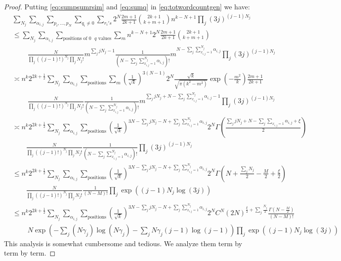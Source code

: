 \documentclass[12pt]{article}
\numberwithin{equation}{section}
\numberwithin{equation}{section}
\theoremstyle{definition}
\renewcommand{\1}{\bf 1}
\begin{document}
\begin{proof}
\noindent
Putting \eqref{eq:sumpsumrsim} and \eqref{eq:sumq} in \eqref{eq:totwordcountgen} we have:
\begin{equation}\label{eq:totwordgensim}
\begin{split}
& \sum_{N_{j}}\sum_{\alpha_{i,j}}\sum_{p_{i},\ldots,p_{N}}\sum_{q_{i} \neq 0}\sum_{r_{i}'s} 2^{N}\frac{2m+1}{2k+1}\binom{2k+1}{k+m+1} n^{k-N+1}\prod_{j}(3j)^{(j-1)N_{j}}\\
& \le \sum_{N_{j}} \sum_{\alpha_{i,j}}\sum_{\text{positions of $0$ $q$ values}} \sum_{m}n^{k-N+1}2^{N}\frac{2m+1}{2k+1} \binom{2k+1}{k+m+1} \\
&~~~~~~~~~~\frac{N}{\prod_{j} ((j-1)!)^{N_{j}} \prod_{j} N_{j}!} m^{\sum_{j} jN_{j}-1} \frac{1}{\left(N- \sum_{j}\sum_{x_{i,j}=1}^{N_{j}}\alpha_{i,j}\right)!} m^{N- \sum_{j}\sum_{x_{i,j}=1}^{N_{j}}\alpha_{i,j}} \prod_{j}(3j)^{(j-1)N_{j}}\\
& \asymp n^{k}2^{2k+\frac{1}{2}}\sum_{N_{j}} \sum_{\alpha_{i,j}}\sum_{\text{positions}} \sum_{m}\left( \frac{1}{\sqrt{k}}\right)^{3(N-1)} 2^{N} \frac{\sqrt{k}}{\sqrt{\pi(k^2-m^{2})}}\exp\left( -\frac{m^2}{k} \right)\frac{2m+1}{2k+1}\\
&~~~~~~~~~~ \frac{N}{\prod_{j} ((j-1)!)^{N_{j}} \prod_{j} N_{j}!}\frac{1}{\left(N- \sum_{j}\sum_{x_{i,j}=1}^{N_{j}}\alpha_{i,j}\right)!} m^{\sum_{j}jN_{j}+ N- \sum_{j}\sum_{x_{i,j}=1}^{N_{j}}\alpha_{i,j}-1} \prod_{j}(3j)^{(j-1)N_{j}}\\
& \asymp n^{k}2^{2k+\frac{1}{2}} \sum_{N_{j}}\sum_{\alpha_{i,j}}\sum_{\text{positions}} \left(  \frac{1}{\sqrt{k}}\right)^{3N  -{\sum_{j}jN_{j}-N+\sum_{j}\sum_{x_{i,j}=1}^{N_{j}}\alpha_{i,j}}}2^{N} \Gamma\left( \frac{\sum_{j}jN_{j}+N-\sum_{j}\sum_{x_{i,j}=1 }\alpha_{i,j}+\xi}{2} \right)\\
& ~~~~~~~~~ \frac{N}{\prod_{j} ((j-1)!)^{N_{j}} \prod_{j} N_{j}!}\frac{1}{\left(N- \sum_{j}\sum_{x_{i,j}=1}^{N_{j}}\alpha_{i,j}\right)!}\prod_{j}(3j)^{(j-1)N_{j}}\\
& \le n^{k}2^{2k+\frac{1}{2}} \sum_{N_{j}}\sum_{\alpha_{i,j}}\sum_{\text{positions}}\left(  \frac{1}{\sqrt{k}}\right)^{3N  -{\sum_{j}jN_{j}-N+\sum_{j}\sum_{x_{i,j}=1}^{N_{j}}\alpha_{i,j}}}2^{N}\Gamma \left( N + \frac{\sum_{j} N_{j}}{2}-\frac{M}{2} + \frac{\xi}{2} \right)\\
&~~~~~~~~~ \frac{N}{\prod_{j} ((j-1)!)^{N_{j}} \prod_{j} N_{j}!}\frac{1}{\left(N- M\right)!} \prod_{j}\exp\left( (j-1)N_{j}\log(3j) \right)\\
&\le n^{k}2^{2k+\frac{1}{2}} \sum_{N_{j}}\sum_{\alpha_{i,j}}\sum_{\text{positions}}\left(  \frac{1}{\sqrt{k}}\right)^{3N  -{\sum_{j}jN_{j}-N+\sum_{j}\sum_{x_{i,j}=1}^{N_{j}}\alpha_{i,j}}} 2^{N}C^{N} (2N)^{\frac{\xi}{2}+ \sum_{j}\frac{N_{j}}{2}} \frac{\Gamma\left(N- \frac{M}{2}\right)}{\left( N-M \right)!}\\
&~~~~~~~~~~N \exp\left( - \sum_{j}\left(N\gamma_{j}\right)\log\left( N\gamma_{j}\right)- \sum_{j}N\gamma_{j}(j-1)\log(j-1) \right)\prod_{j}\exp\left( (j-1)N_{j}\log (3j) \right)
\end{split}
\end{equation}
This analysis is somewhat cumbersome and tedious. We analyze them term by term by term. 


\end{proof}
\end{document}
